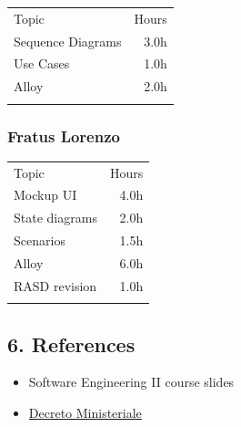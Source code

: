 \begin{longtable}[]{@{}lr@{}}
\toprule
Topic & Hours \\ \addlinespace
\midrule
\endhead
Sequence Diagrams & 3.0h \\ \addlinespace
Use Cases & 1.0h \\ \addlinespace
Alloy & 2.0h \\ \addlinespace
\bottomrule
\end{longtable}

\hypertarget{fratus-lorenzo}{%
\subsubsection{Fratus Lorenzo}\label{fratus-lorenzo}}

\begin{longtable}[]{@{}lr@{}}
\toprule
Topic & Hours \\ \addlinespace
\midrule
\endhead
Mockup UI & 4.0h \\ \addlinespace
State diagrams & 2.0h \\ \addlinespace
Scenarios & 1.5h \\ \addlinespace
Alloy & 6.0h \\ \addlinespace
RASD revision & 1.0h \\ \addlinespace
\bottomrule
\end{longtable}

\hypertarget{references}{%
\subsection{6. References}\label{references}}

\begin{itemize}
\tightlist
\item
  Software Engineering II course slides
\item
  \href{https://www.gazzettaufficiale.it/atto/vediPermalink?atto.dataPubblicazioneGazzetta=2020-11-09\&atto.codiceRedazionale=20G00170\&tipoSerie=serie_generale\&tipoVigenza=originario\&tipoProvvedimento=*}{Decreto
  Ministeriale}
\end{itemize}
